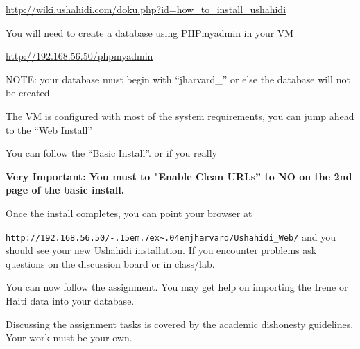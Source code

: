 \documentclass[letterpaper]{article}
\def\urltilde{\kern -.15em\lower .7ex\hbox{\~{}}\kern .04em}
\begin{document}
\url{http://wiki.ushahidi.com/doku.php?id=how\_to\_install\_ushahidi}

You will need to create a database using PHPmyadmin in your VM

\url{http://192.168.56.50/phpmyadmin}

NOTE: your database must begin with ``jharvard\_'' or else the database will not
be created.

The VM is configured with most of the system requirements, you can jump ahead
to the ``Web Install''

You can follow the ``Basic Install''.  or if you really 

{\bf Very Important: You must to "Enable Clean URLs'' to NO on the 2nd page
of the basic install.}

Once the install completes, you can point your browser at

{\tt http://192.168.56.50/\urltilde jharvard/Ushahidi\_Web/} and you should see
your new Ushahidi installation.  If you encounter problems ask questions on the
discussion board or in class/lab.

You can now follow the assignment.  You may get help on importing the Irene or
Haiti data into your database.

Discussing the assignment tasks is covered by the academic dishonesty
guidelines.  Your work must be your own.


\end{document}
